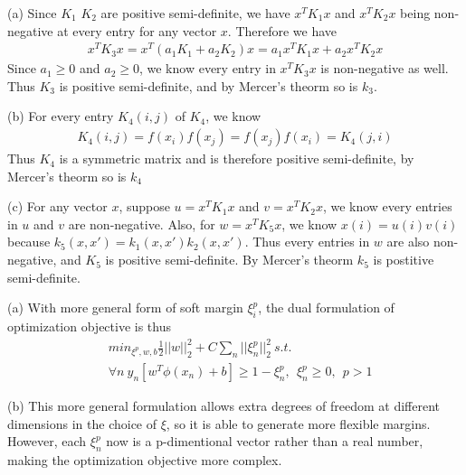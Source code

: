 \documentclass[12pt]{article}
\newenvironment{problem}[2][Problem]{\begin{trivlist}
\item[\hskip \labelsep {\bfseries #1}\hskip \labelsep {\bfseries #2}]}{\end{trivlist}}
\begin{document}
\begin{problem}{3. Kernels}
\item{(a)}
Since $K_1$ $K_2$ are positive semi-definite, we have $x^TK_1x$ and $x^TK_2x$ being non-negative at every entry for any vector $x$. Therefore we have
\begin{align*}
x^TK_3x = x^T(a_1K_1 + a_2K_2)x = a_1x^TK_1x + a_2x^TK_2x
\end{align*}
Since $a_1 \geq 0$ and $a_2 \geq 0$, we know every entry in $x^TK_3x$ is non-negative as well. Thus $K_3$ is positive semi-definite, and by Mercer's theorm so is $k_3$.
\\
\item{(b)} 
For every entry $K_4(i, j)$ of $K_4$, we know
\begin{align*}
K_4(i, j) = f(x_i)f(x_j) = f(x_j)f(x_i) = K_4(j, i)
\end{align*}
Thus $K_4$ is a symmetric matrix and is therefore positive semi-definite, by Mercer's theorm so is $k_4$
\item{(c)}
For any vector $x$, suppose $u = x^TK_1x$ and $v = x^TK_2x$, we know every entries in $u$ and $v$ are non-negative. Also, for $w = x^TK_5x$, we know $x(i) = u(i)v(i)$ because $k_5(x, x') = k_1(x, x')k_2(x, x')$. Thus every entries in $w$ are also non-negative, and $K_5$ is positive semi-definite. By Mercer's theorm $k_5$ is postitive semi-definite.
\end{problem}

\begin{problem}{4. Soft Margin Hyperplanes}
\item{(a)} With more general form of soft margin $\xi_i^p$, the dual formulation of optimization objective is thus
\begin{align*}
	&min_{\xi^p, w, b} \frac{1}{2}||w||_2^2 + C\sum_n||\xi_n^p||_2^2 \ s.t.\\
	&\forall n \ y_n[w^T\phi(x_n)+b] \geq 1 - \xi_n^p, \ \ \xi_n^p \geq 0, \ \ p > 1
\end{align*}
\item{(b)}
This more general formulation allows extra degrees of freedom at different dimensions in the choice of $\xi$, so it is able to generate more flexible margins. However, each $\xi_n^p$ now is a p-dimentional vector rather than a real number, making the optimization objective more complex.
\end{problem}
 
\end{document}
